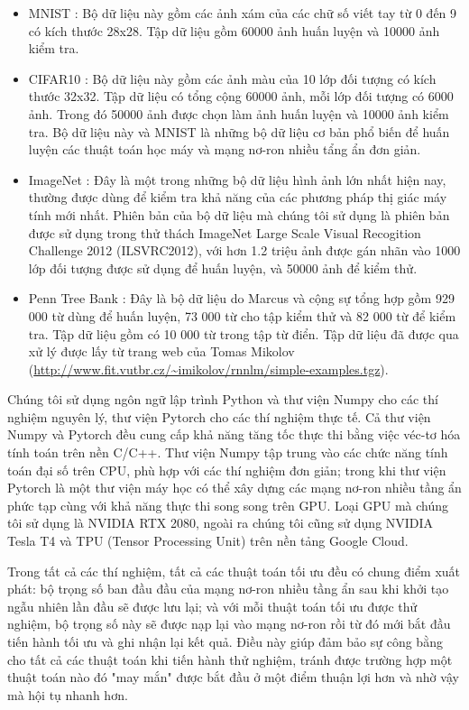 \begin{itemize}
	\item MNIST \cite{lecun2010mnist}: Bộ dữ liệu này gồm các ảnh xám của các chữ số viết tay từ 0 đến 9 có kích thước 28x28. Tập dữ liệu gồm 60000 ảnh huấn luyện và 10000 ảnh kiểm tra.
	\item CIFAR10 \cite{krizhevsky2009cifar10}: Bộ dữ liệu này gồm các ảnh màu của 10 lớp đối tượng có kích thước 32x32. Tập dữ liệu có tổng cộng 60000 ảnh, mỗi lớp đối tượng có 6000 ảnh. Trong đó 50000 ảnh được chọn làm ảnh huấn luyện và 10000 ảnh kiểm tra. Bộ dữ liệu này và MNIST là những bộ dữ liệu cơ bản phổ biến để huấn luyện các thuật toán học máy và mạng nơ-ron nhiều tẩng ẩn đơn giản.
	\item ImageNet \cite{deng2009imagenet}: Đây là một trong những bộ dữ liệu hình ảnh lớn nhất hiện nay, thường được dùng để kiểm tra khả năng của các phương pháp thị giác máy tính mới nhất. Phiên bản của bộ dữ liệu mà chúng tôi sử dụng là phiên bản được sử dụng trong thử thách ImageNet Large Scale Visual Recogition Challenge 2012 (ILSVRC2012), với hơn 1.2 triệu ảnh được gán nhãn vào 1000 lớp đối tượng được sử dụng để huấn luyện, và 50000 ảnh để kiểm thử.
	\item Penn Tree Bank \cite{marcus1993ptb}: Đây là bộ dữ liệu do Marcus và cộng sự tổng hợp gồm 929 000 từ dùng để huấn luyện, 73 000 từ cho tập kiểm thử và 82 000 từ để kiểm tra. Tập dữ liệu gồm có 10 000 từ trong tập từ điển. Tập dữ liệu đã được qua xử lý được lấy từ trang web của Tomas Mikolov (\url{http://www.fit.vutbr.cz/~imikolov/rnnlm/simple-examples.tgz}).
\end{itemize}

Chúng tôi sử dụng ngôn ngữ lập trình Python và thư viện Numpy cho các thí nghiệm nguyên lý, thư viện Pytorch cho các thí nghiệm thực tế. Cả thư viện Numpy và Pytorch đều cung cấp khả năng tăng tốc thực thi bằng việc véc-tơ hóa tính toán trên nền C/C++. Thư viện Numpy tập trung vào các chức năng tính toán đại số trên CPU, phù hợp với các thí nghiệm đơn giản; trong khi thư viện Pytorch là một thư viện máy học có thể xây dựng các mạng nơ-ron nhiều tầng ẩn phức tạp cùng với khả năng thực thi song song trên GPU. Loại GPU mà chúng tôi sử dụng là NVIDIA RTX 2080, ngoài ra chúng tôi cũng sử dụng NVIDIA Tesla T4 và TPU (Tensor Processing Unit) trên nền tảng Google Cloud.

Trong tất cả các thí nghiệm, tất cả các thuật toán tối ưu đều có chung điểm xuất phát: bộ trọng số ban đầu đầu của mạng nơ-ron nhiều tầng ẩn sau khi khởi tạo ngẫu nhiên lần đầu sẽ được lưu lại; và với mỗi thuật toán tối ưu được thử nghiệm, bộ trọng số này sẽ được nạp lại vào mạng nơ-ron rồi từ đó mới bắt đầu tiến hành tối ưu và ghi nhận lại kết quả. Điều này giúp đảm bảo sự công bằng cho tất cả các thuật toán khi tiến hành thử nghiệm, tránh được trường hợp một thuật toán nào đó "may mắn" được bắt đầu ở một điểm thuận lợi hơn và nhờ vậy mà hội tụ nhanh hơn.

